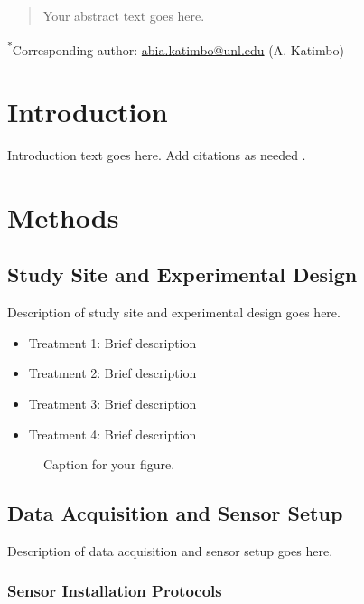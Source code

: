 \documentclass[12pt]{article}
\begin{document}
\vspace{1em}
\begin{abstract}
Your abstract text goes here.
\end{abstract}

\vspace{1em}
\noindent
\textsuperscript{*}Corresponding author: \href{mailto:abia.katimbo@unl.edu}{abia.katimbo@unl.edu} (A. Katimbo)

\section{Introduction}

\noindent
Introduction text goes here. Add citations as needed \cite{reference1}.

\section{Methods}

\subsection{Study Site and Experimental Design}
\label{sec:study-site}

Description of study site and experimental design goes here.

\begin{itemize}
    \item Treatment 1: Brief description
    \item Treatment 2: Brief description
    \item Treatment 3: Brief description
    \item Treatment 4: Brief description
\end{itemize}

\begin{figure}[htbp]
    \centering
    \caption{Caption for your figure.}
    \label{fig:experimental-layout}
\end{figure}

\subsection{Data Acquisition and Sensor Setup}

Description of data acquisition and sensor setup goes here.

\subsubsection{Sensor Installation Protocols}
\end{document}
